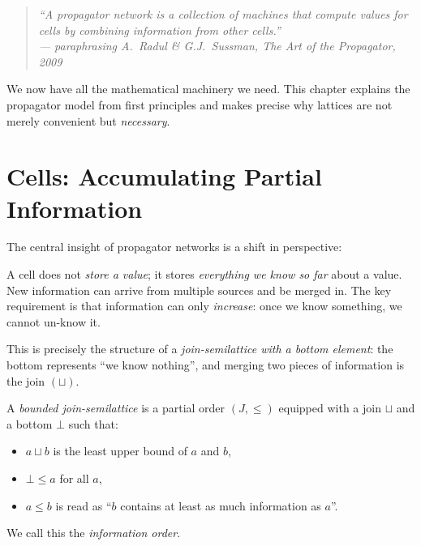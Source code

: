 \documentclass[12pt, a4paper, openright]{book}
\theoremstyle{thmstyle}
\theoremstyle{defstyle}
\newenvironment{defbox}[1][]{%
  \begin{tcolorbox}[defbox, title={Definition\ifx\\#1\\\else\ --- #1\fi}]%
}{\end{tcolorbox}}
\begin{document}
\begin{quote}
  \itshape
  ``A propagator network is a collection of machines that compute
  values for cells by combining information from other cells.''\\
  --- paraphrasing A.\ Radul \& G.J.\ Sussman, \emph{The Art of the Propagator}, 2009
\end{quote}

We now have all the mathematical machinery we need. This chapter explains the
propagator model from first principles and makes precise why lattices are not
merely convenient but \emph{necessary}.

\section{Cells: Accumulating Partial Information}

The central insight of propagator networks is a shift in perspective:

\begin{center}
\end{center}

A cell does not \emph{store a value}; it stores \emph{everything we know so
far} about a value. New information can arrive from multiple sources and be
merged in. The key requirement is that information can only \emph{increase}:
once we know something, we cannot un-know it.

This is precisely the structure of a \emph{join-semilattice with a bottom
element}: the bottom represents ``we know nothing'', and merging two pieces of
information is the join $(\sqcup)$.

\begin{defbox}[Information Order]
  A \emph{bounded join-semilattice} is a partial order $(J, \leq)$ equipped with
  a join $\sqcup$ and a bottom $\bot$ such that:
  \begin{itemize}[nosep]
    \item $a \sqcup b$ is the least upper bound of $a$ and $b$,
    \item $\bot \leq a$ for all $a$,
    \item $a \leq b$ is read as ``$b$ contains at least as much information as $a$''.
  \end{itemize}
  We call this the \emph{information order}.
\end{defbox}
\end{document}
